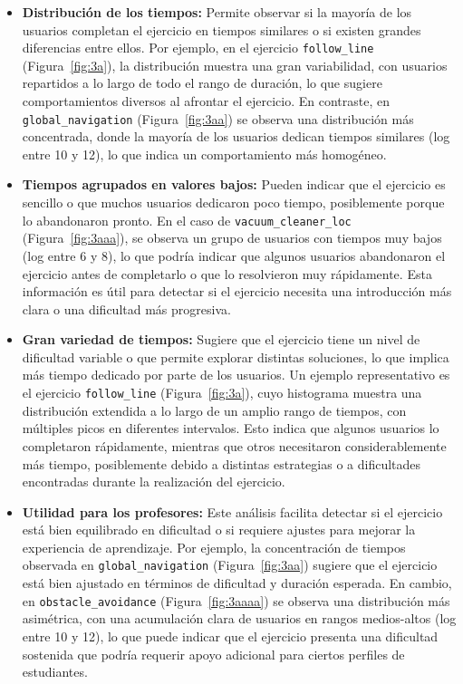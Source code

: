 \documentclass[a4paper, 12pt]{book}
\begin{document}
\begin{itemize}
  \item \textbf{Distribución de los tiempos:} Permite observar si la mayoría de los usuarios completan el ejercicio en tiempos similares o si existen grandes diferencias entre ellos.  
  Por ejemplo, en el ejercicio \texttt{follow\_line} (Figura~\ref{fig:3a}), la distribución muestra una gran variabilidad, con usuarios repartidos a lo largo de todo el rango de duración, lo que sugiere comportamientos diversos al afrontar el ejercicio. En contraste, en \texttt{global\_navigation} (Figura~\ref{fig:3aa}) se observa una distribución más concentrada, donde la mayoría de los usuarios dedican tiempos similares (log entre 10 y 12), lo que indica un comportamiento más homogéneo.

  \item \textbf{Tiempos agrupados en valores bajos:} Pueden indicar que el ejercicio es sencillo o que muchos usuarios dedicaron poco tiempo, posiblemente porque lo abandonaron pronto.  
  En el caso de \texttt{vacuum\_cleaner\_loc} (Figura~\ref{fig:3aaa}), se observa un grupo de usuarios con tiempos muy bajos (log entre 6 y 8), lo que podría indicar que algunos usuarios abandonaron el ejercicio antes de completarlo o que lo resolvieron muy rápidamente. Esta información es útil para detectar si el ejercicio necesita una introducción más clara o una dificultad más progresiva.

  \item \textbf{Gran variedad de tiempos:} Sugiere que el ejercicio tiene un nivel de dificultad variable o que permite explorar distintas soluciones, lo que implica más tiempo dedicado por parte de los usuarios.  
  Un ejemplo representativo es el ejercicio \texttt{follow\_line} (Figura~\ref{fig:3a}), cuyo histograma muestra una distribución extendida a lo largo de un amplio rango de tiempos, con múltiples picos en diferentes intervalos. Esto indica que algunos usuarios lo completaron rápidamente, mientras que otros necesitaron considerablemente más tiempo, posiblemente debido a distintas estrategias o a dificultades encontradas durante la realización del ejercicio.

  \item \textbf{Utilidad para los profesores:} Este análisis facilita detectar si el ejercicio está bien equilibrado en dificultad o si requiere ajustes para mejorar la experiencia de aprendizaje.  
  Por ejemplo, la concentración de tiempos observada en \texttt{global\_navigation} (Figura~\ref{fig:3aa}) sugiere que el ejercicio está bien ajustado en términos de dificultad y duración esperada. En cambio, en \texttt{obstacle\_avoidance} (Figura~\ref{fig:3aaaa}) se observa una distribución más asimétrica, con una acumulación clara de usuarios en rangos medios-altos (log entre 10 y 12), lo que puede indicar que el ejercicio presenta una dificultad sostenida que podría requerir apoyo adicional para ciertos perfiles de estudiantes.
\end{itemize}
\end{document}
